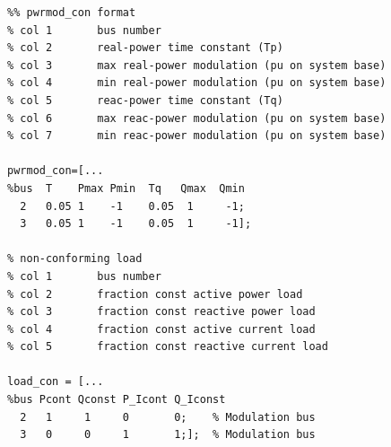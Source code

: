 \begin{verbatim}
%% pwrmod_con format
% col 1       bus number
% col 2       real-power time constant (Tp)
% col 3       max real-power modulation (pu on system base)
% col 4       min real-power modulation (pu on system base)
% col 5       reac-power time constant (Tq)
% col 6       max reac-power modulation (pu on system base)
% col 7       min reac-power modulation (pu on system base)

pwrmod_con=[...
%bus  T    Pmax Pmin  Tq   Qmax  Qmin
  2   0.05 1    -1    0.05  1     -1; 
  3   0.05 1    -1    0.05  1     -1];

% non-conforming load
% col 1       bus number
% col 2       fraction const active power load
% col 3       fraction const reactive power load
% col 4       fraction const active current load
% col 5       fraction const reactive current load

load_con = [...
%bus Pcont Qconst P_Icont Q_Iconst
  2   1     1     0       0;    % Modulation bus
  3   0     0     1       1;];  % Modulation bus
\end{verbatim}
